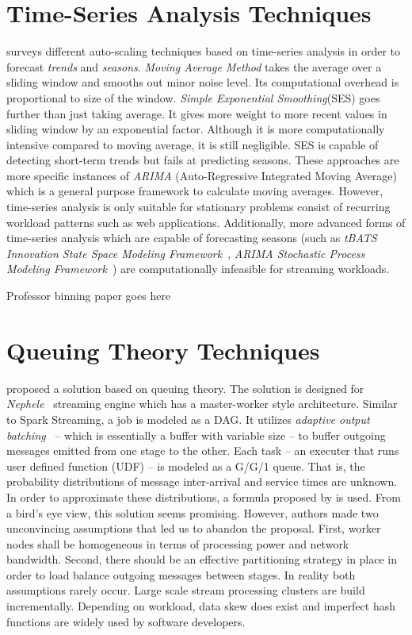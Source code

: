\section{Time-Series Analysis Techniques}
\label{related:tsa}
\textcite{Herbst:2013} surveys different auto-scaling techniques based on time-series analysis in order to forecast \emph{trends} and \emph{seasons}. \emph{Moving Average Method} takes the average over a sliding window and smooths out minor noise level. Its computational overhead is proportional to size of the window. \emph{Simple Exponential Smoothing}(SES) goes further than just taking average. It gives more weight to more recent values in sliding window by an exponential factor. Although it is more computationally intensive compared to moving average, it is still negligible. SES is capable of detecting short-term trends but fails at predicting seasons. These approaches are more specific instances of \emph{ARIMA} (Auto-Regressive Integrated Moving Average) which is a general purpose framework to calculate moving averages. However, time-series analysis is only suitable for stationary problems consist of recurring workload patterns such as web applications. Additionally, more advanced forms of time-series analysis which are capable of forecasting seasons (such as \emph{tBATS Innovation State Space Modeling Framework}~\cite{Alysha2011}, \emph{ARIMA Stochastic Process Modeling Framework}~\cite{JSSv027i03}) are computationally infeasible for streaming workloads.

Professor binning paper goes here

\section{Queuing Theory Techniques}
\label{related:qt}
\textcite{Lohrmann:2015} proposed a solution based on queuing theory. The solution is designed for \emph{Nephele}~\cite{Lohrmann:2014} streaming engine which has a master-worker style architecture. Similar to Spark Streaming, a job is modeled as a DAG. It utilizes \emph{adaptive output batching}~\cite{Warneke:2011} -- which is essentially a buffer with variable size -- to buffer outgoing messages emitted from one stage to the other. Each task -- an executer that runs user defined function (UDF) -- is modeled as a G/G/1 queue. That is, the probability distributions of message inter-arrival and service times are unknown. In order to approximate these distributions, a formula proposed by \textcite{Kingman:1961} is used. From a bird's eye view, this solution seems promising. However, authors made two unconvincing assumptions that led us to abandon the proposal. First, worker nodes shall be homogeneous in terms of processing power and network bandwidth. Second, there should be an effective partitioning strategy in place in order to load balance outgoing messages between stages. In reality both assumptions rarely occur. Large scale stream processing clusters are build incrementally. Depending on workload, data skew does exist and imperfect hash functions are widely used by software developers.
 
